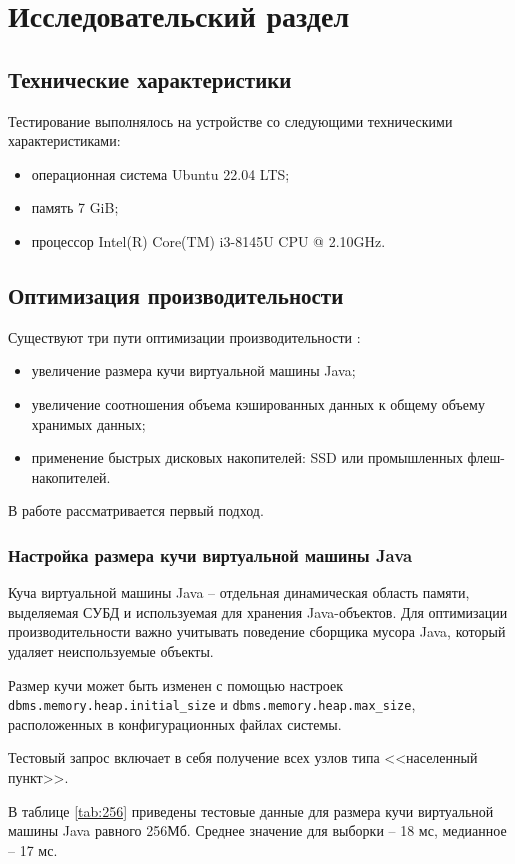\chapter{Исследовательский раздел}\label{sec:exp}
\section{Технические характеристики}
Тестирование выполнялось на устройстве со следующими техническими характеристиками:
\begin{itemize}
	\item операционная система Ubuntu 22.04 LTS;
	\item память 7 GiB;
	\item процессор Intel(R) Core(TM) i3-8145U CPU @ 2.10GHz.
\end{itemize}
\section{Оптимизация производительности}
Существуют три пути оптимизации производительности \cite{Ян2016}:
\begin{itemize}
	\item увеличение размера кучи виртуальной машины Java;
	\item увеличение соотношения объема кэшированных данных к общему объему хранимых данных;
	\item применение быстрых дисковых накопителей: SSD или промышленных флеш-накопителей.
\end{itemize}
В работе рассматривается первый подход. 
\subsection{Настройка размера кучи виртуальной машины Java}
Куча виртуальной машины Java -- отдельная динамическая область памяти, выделяемая СУБД и используемая для хранения Java-объектов. Для оптимизации производительности важно учитывать поведение сборщика мусора Java, который удаляет неиспользуемые объекты. 

Размер кучи может быть изменен с помощью настроек \lstinline|dbms.memory.heap.initial_size| и \lstinline|dbms.memory.heap.max_size|, расположенных в конфигурационных файлах системы. 

Тестовый запрос включает в себя получение всех узлов типа <<населенный пункт>>.

В таблице \ref{tab:256} приведены тестовые данные для размера кучи виртуальной машины Java равного 256Мб. Среднее значение для выборки -- 18 мс, медианное -- 17 мс. 


